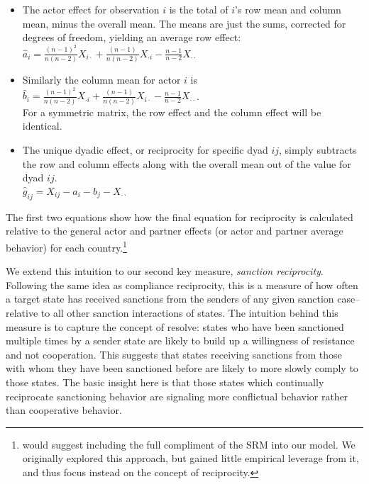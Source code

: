  \begin{itemize}
 \item The actor effect for observation $i$ is the total of $i$'s row mean and column mean, minus the overall mean.  The means are just the sums, corrected for degrees of freedom, yielding an average row effect:\\
 $\hat{a}_i = \frac{(n-1)^2}{n(n-2)} X_{i \cdot} + \frac{(n-1)}{n(n-2)} X_{\cdot i} -  \frac{n-1}{n-2} X_{\cdot \cdot} $
\item Similarly the column mean for actor $i$ is \\
 $\hat{b}_i = \frac{(n-1)^2}{n(n-2)} X_{\cdot i} + \frac{(n-1)}{n(n-2)} X_{i \cdot } -  \frac{n-1}{n-2} X_{\cdot \cdot} $.\\ For a symmetric matrix, the row effect and the column effect will be identical.
\item The unique dyadic effect, or reciprocity for specific dyad $ij$, simply subtracts the row and column effects along with the overall mean out of the value for dyad $ij$. \\
$\hat{g}_{ij} = X_{ij} - \hat{a}_i - \hat{b}_j - X_{\cdot \cdot}$
 \end{itemize}

\doublespacing
The first two equations show how the final equation for reciprocity is calculated relative to the general actor and partner effects (or actor and partner average behavior) for each country.\footnote{\cite{kenny1994interpersonal} would suggest including the full compliment of the SRM into our model. We originally explored this approach, but gained little empirical leverage from it, and thus focus instead on the concept of reciprocity.} %

We extend this intuition to our second key measure, \textit{sanction reciprocity}. Following the same idea as compliance reciprocity, this is a measure of how often a target state has received sanctions from the senders of any given sanction case--relative to all other sanction interactions of states. The intuition behind this measure is to capture the concept of resolve: states who have been sanctioned multiple times by a sender state are likely to build up a willingness of resistance and not cooperation.  This suggests that states receiving sanctions from those with whom they have been sanctioned before are likely to more slowly comply to those states. The basic insight here is that those states which continually reciprocate sanctioning behavior are signaling more conflictual behavior rather than cooperative behavior. 

